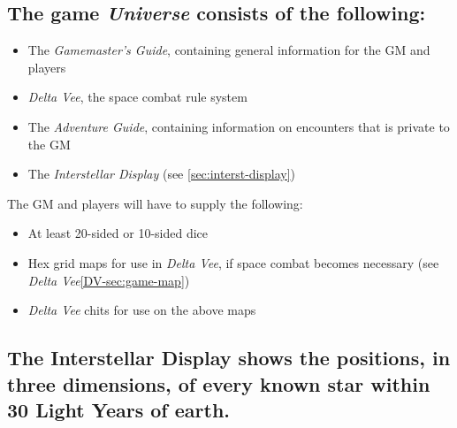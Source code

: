 

\subsection[Contents of Game]{The game \emph{Universe} consists of the
  following:}
\label{sec:contents}

\begin{itemize}
\item The \emph{Gamemaster's Guide}, containing general information
  for the GM and players
\item \emph{Delta Vee}, the space combat rule system
\item The \emph{Adventure Guide}, containing information on encounters
  that is private to the GM
\item The \emph{Interstellar Display} (see \vref{sec:interst-display})
\end{itemize}

The GM and players will have to supply the following:

\begin{itemize}
\item At least 20-sided or 10-sided dice
\item Hex grid maps for use in \emph{Delta Vee}, if space combat
  becomes necessary (see \emph{Delta Vee}\ref{DV-sec:game-map})
\item \emph{Delta Vee} chits for use on the above maps
\end{itemize}

\subsection[The Interstellar Display]{The Interstellar Display shows
  the positions, in three  dimensions, of every known star within 30
  Light Years of earth.}
\label{sec:interst-display}

